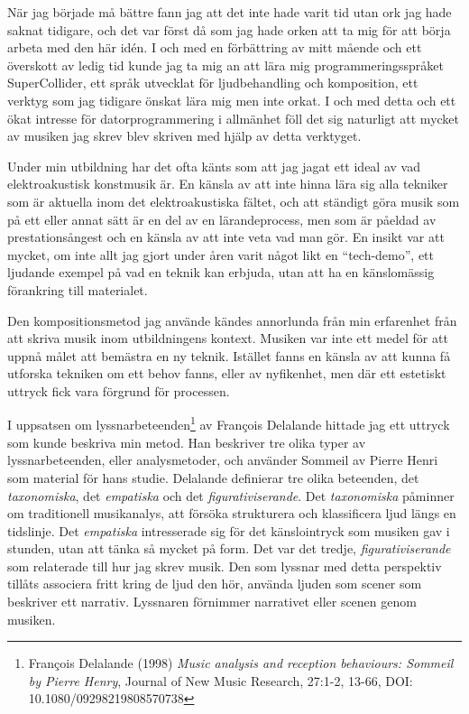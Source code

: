 \documentclass{article}
\begin{document}
När jag började må bättre fann jag att det inte hade varit tid utan ork jag hade saknat tidigare, och det var
först då som jag hade orken att ta mig för att börja arbeta med den här idén. I och med en förbättring av
mitt mående och ett överskott av ledig tid kunde jag ta mig an att lära mig programmeringsspråket
SuperCollider, ett språk utvecklat för ljudbehandling och komposition, ett verktyg som jag
tidigare önskat lära mig men inte orkat. I och med detta och ett ökat intresse för datorprogrammering i
allmänhet föll det sig naturligt att mycket av musiken jag skrev blev skriven med hjälp av detta verktyget.

Under min utbildning har det ofta känts som att jag jagat ett ideal av vad elektroakustisk konstmusik är. En
känsla av att inte hinna lära sig alla tekniker som är aktuella inom det elektroakustiska fältet, och att
ständigt göra musik som på ett eller annat sätt är en del av en lärandeprocess, men som är påeldad av
prestationsångest och en känsla av att inte veta vad man gör. En insikt var att mycket, om inte allt jag gjort
under åren varit något likt en ``tech-demo'', ett ljudande exempel på vad en teknik kan erbjuda, utan att ha en
känslomässig förankring till materialet.

Den kompositionsmetod jag använde kändes annorlunda från min erfarenhet från att skriva musik inom
utbildningens kontext. Musiken var inte ett medel för att uppnå målet att bemästra en ny teknik. Istället
fanns en känsla av att kunna få utforska tekniken om ett behov fanns, eller av nyfikenhet, men där ett
estetiskt uttryck fick vara förgrund för processen. 

I uppsatsen om lyssnarbeteenden\footnote{François Delalande (1998) \emph{Music analysis and reception
behaviours: Sommeil by Pierre Henry}, Journal of New Music Research, 27:1-2, 13-66, DOI:
10.1080/09298219808570738} av François Delalande hittade jag ett uttryck som kunde beskriva min metod. Han
beskriver tre olika typer av lyssnarbeteenden, eller analysmetoder, och använder Sommeil av Pierre Henri som
material för hans studie. Delalande definierar tre olika beteenden, det \emph{taxonomiska}, det
\emph{empatiska} och det \emph{figurativiserande}. Det \emph{taxonomiska} påminner om traditionell
musikanalys, att försöka strukturera och klassificera ljud längs en tidslinje. Det \emph{empatiska}
intresserade sig för det känslointryck som musiken gav i stunden, utan att tänka så mycket på form. Det var
det tredje, \emph{figurativiserande} som relaterade till hur jag skrev musik. Den som lyssnar med detta
perspektiv tillåts associera fritt kring de ljud den hör, använda ljuden som scener som beskriver ett
narrativ. Lyssnaren förnimmer narrativet eller scenen genom musiken. 
\end{document}
